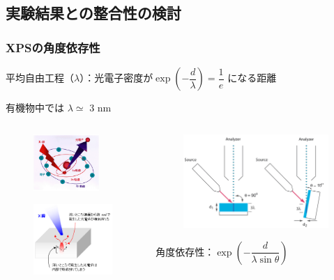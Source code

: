 \documentclass[12pt, dvipdfmx]{beamer}
\begin{document}
\subsection{実験結果との整合性の検討}
\begin{frame}\frametitle{XPSの角度依存性}

{\small %

平均自由工程（$\lambda$）：光電子密度が$\exp \left(-\dfrac{d}{\lambda}\right) = \dfrac{1}{e}$ になる距離

有機物中では $\lambda \simeq$ 3 nm}
\begin{columns}
\begin{column}{4cm}
	\vspace{-10pt}
	\begin{figure}[htbp]
		\begin{center}
			\includegraphics[width=25mm]{XPS_Genri_1.png}
		\end{center}
	\end{figure}
	\vspace{-20pt}
	\begin{figure}[htbp]
		\begin{center}
			\includegraphics[width=30mm]{XPS_Genri_3.png}
		\end{center}
	\end{figure}
\end{column}
\begin{column}{7cm}
	\begin{figure}[htbp]
		\begin{center}
			\includegraphics[width=55mm]{XPS_KAKUDO.png}
		\end{center}
\end{figure}

\vspace{-5pt}
{\small 角度依存性：$\exp \left(-\dfrac{d}{\lambda \sin \theta}\right)$}

\end{column}
\end{columns}

\end{frame}
\end{document}
